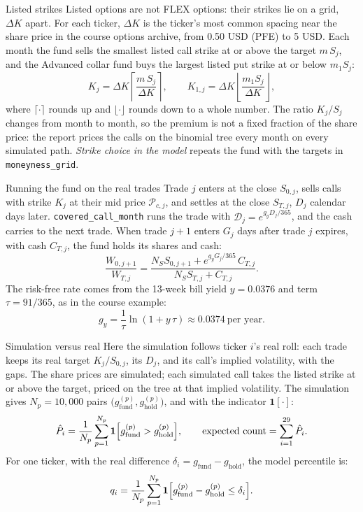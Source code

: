 \documentclass[aspectratio=169,11pt]{beamer}
\newcommand{\Prem}{\mathcal{P}}
\newcommand{\Dfac}{\mathcal{D}}
\newcommand{\one}{\mathbf{1}}
\begin{document}
\begin{frame}{Listed strikes}
Listed options are not FLEX options: their strikes lie on a grid, $\Delta K$
apart. For each ticker, $\Delta K$ is the ticker's most common spacing near the share
price in the course options archive, from 0.50 USD (PFE) to 5 USD. Each month
the fund sells the smallest listed call strike at or above the target $m\,S_j$,
and the Advanced collar fund buys the largest listed put strike at or below
$m_1 S_j$:
\[
 K_j=\Delta K\left\lceil\frac{m\,S_j}{\Delta K}\right\rceil,\qquad
 K_{1,j}=\Delta K\left\lfloor\frac{m_1 S_j}{\Delta K}\right\rfloor,
\]
where $\lceil\cdot\rceil$ rounds up and $\lfloor\cdot\rfloor$ rounds down to a whole number.
The ratio $K_j/S_j$ changes from month to month, so the premium is not a fixed
fraction of the share price: the report prices the calls on the binomial tree
every month on every simulated path. \textit{Strike choice in the model} repeats
the fund with the targets in \texttt{moneyness\_grid}.
\end{frame}

\begin{frame}{Running the fund on the real trades}
Trade $j$ enters at the close $S_{0,j}$, sells calls with strike $K_j$ at
their mid price $\Prem_{c,j}$, and settles at the close $S_{T,j}$, $D_j$ calendar
days later. \texttt{covered\_call\_month} runs the trade with $\Dfac_j=e^{g_y D_j/365}$,
and the cash carries to the next trade. When trade $j+1$ enters $G_j$ days after
trade $j$ expires, with cash $C_{T,j}$, the fund holds its shares and cash:
\[
 \frac{W_{0,j+1}}{W_{T,j}}=\frac{N_S S_{0,j+1}+e^{g_y G_j/365}\,C_{T,j}}{N_S S_{T,j}+C_{T,j}}.
\]
The risk-free rate comes from the 13-week bill yield $y=0.0376$ and term
$\tau=91/365$, as in the course example:
\[
 g_y=\frac{1}{\tau}\ln\left(1+y\,\tau\right)\approx0.0374\ \text{per year}.
\]
\end{frame}

\begin{frame}{Simulation versus real}
Here the simulation follows ticker $i$'s real roll: each trade keeps its real
target $K_j/S_{0,j}$, its $D_j$, and its call's implied volatility, with the
gaps. The share prices are simulated; each simulated call takes the listed
strike at or above the target, priced on the tree at that implied volatility.
The simulation gives $N_p=10{,}000$ pairs
$\bigl(g_{\text{fund}}^{(p)},g_{\text{hold}}^{(p)}\bigr)$, and with the
indicator $\one[\cdot]$:
\[
 \hat P_i=\frac{1}{N_p}\sum_{p=1}^{N_p}
 \one\Bigl[g_{\text{fund}}^{(p)}>g_{\text{hold}}^{(p)}\Bigr],
 \qquad
 \text{expected count}=\sum_{i=1}^{29}\hat P_i .
\]
For one ticker, with the real difference $\delta_i=g_{\text{fund}}-g_{\text{hold}}$,
the model percentile is:
\[
 q_i=\frac{1}{N_p}\sum_{p=1}^{N_p}
 \one\Bigl[g_{\text{fund}}^{(p)}-g_{\text{hold}}^{(p)}\leq\delta_i\Bigr].
\]
\end{frame}
\end{document}
